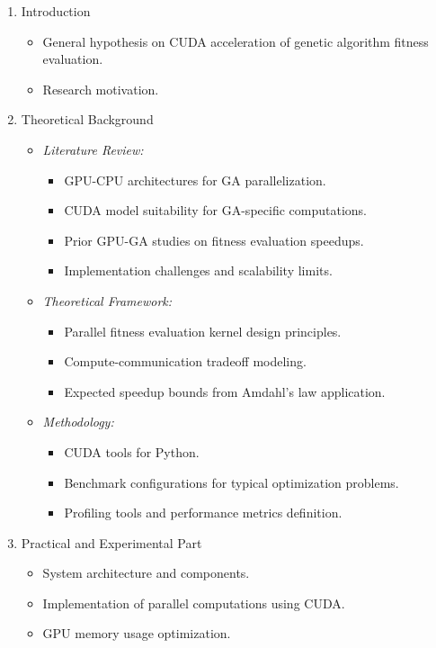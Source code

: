 \small
\begin{enumerate}[label=\arabic*., leftmargin=*, itemsep=0.1cm]
\item {Introduction}
\begin{itemize}[noitemsep, topsep=0pt]
    \item General hypothesis on CUDA acceleration of genetic algorithm fitness evaluation.
    \item Research motivation.
\end{itemize}

\item {Theoretical Background}
\begin{itemize}[noitemsep, topsep=0pt]
    \item \textit{Literature Review:}
    \begin{itemize}[noitemsep]
        \item GPU-CPU architectures for GA parallelization.
        \item CUDA model suitability for GA-specific computations.
        \item Prior GPU-GA studies on fitness evaluation speedups.
        \item Implementation challenges and scalability limits.
    \end{itemize}
    \item \textit{Theoretical Framework:}
    \begin{itemize}[noitemsep]
        \item Parallel fitness evaluation kernel design principles.
        \item Compute-communication tradeoff modeling.
        \item Expected speedup bounds from Amdahl's law application.
    \end{itemize}
    \item \textit{Methodology:}
    \begin{itemize}[noitemsep]
        \item CUDA tools for Python.
        \item Benchmark configurations for typical optimization problems.
        \item Profiling tools and performance metrics definition.
    \end{itemize}
\end{itemize}

\item {Practical and Experimental Part}
\begin{itemize}[noitemsep, topsep=0pt]
    \item System architecture and components.
    \item Implementation of parallel computations using CUDA.
    \item GPU memory usage optimization.
\end{itemize}


\end{enumerate}
